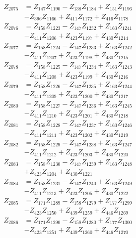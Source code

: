 \begin{multicols}{2}
\begin{align}
Z_{2075} &= Z_{147}Z_{1190} - Z_{138}Z_{1184} + Z_{151}Z_{1196}  \nonumber \\
&- Z_{396}Z_{1166} + Z_{411}Z_{1172} + Z_{416}Z_{1178} \nonumber \\
Z_{2076} &= Z_{158}Z_{1223} - Z_{147}Z_{1232} + Z_{163}Z_{1241}  \nonumber \\
&- Z_{411}Z_{1206} + Z_{423}Z_{1197} + Z_{430}Z_{1214} \nonumber \\
Z_{2077} &= Z_{158}Z_{1224} - Z_{147}Z_{1233} + Z_{163}Z_{1242}  \nonumber \\
&- Z_{411}Z_{1207} + Z_{423}Z_{1198} + Z_{430}Z_{1215} \nonumber \\
Z_{2078} &= Z_{158}Z_{1225} - Z_{147}Z_{1234} + Z_{163}Z_{1243}  \nonumber \\
&- Z_{411}Z_{1208} + Z_{423}Z_{1199} + Z_{430}Z_{1216} \nonumber \\
Z_{2079} &= Z_{158}Z_{1226} - Z_{147}Z_{1235} + Z_{163}Z_{1244}  \nonumber \\
&- Z_{411}Z_{1209} + Z_{423}Z_{1200} + Z_{430}Z_{1217} \nonumber \\
Z_{2080} &= Z_{158}Z_{1227} - Z_{147}Z_{1236} + Z_{163}Z_{1245}  \nonumber \\
&- Z_{411}Z_{1210} + Z_{423}Z_{1201} + Z_{430}Z_{1218} \nonumber \\
Z_{2081} &= Z_{158}Z_{1228} - Z_{147}Z_{1237} + Z_{163}Z_{1246}  \nonumber \\
&- Z_{411}Z_{1211} + Z_{423}Z_{1202} + Z_{430}Z_{1219} \nonumber \\
Z_{2082} &= Z_{158}Z_{1229} - Z_{147}Z_{1238} + Z_{163}Z_{1247}  \nonumber \\
&- Z_{411}Z_{1212} + Z_{423}Z_{1203} + Z_{430}Z_{1220} \nonumber \\
Z_{2083} &= Z_{158}Z_{1230} - Z_{147}Z_{1239} + Z_{163}Z_{1248}  \nonumber \\
&+ Z_{423}Z_{1204} + Z_{430}Z_{1221} \nonumber \\
Z_{2084} &= Z_{158}Z_{1231} - Z_{147}Z_{1240} + Z_{163}Z_{1249}  \nonumber \\
&- Z_{411}Z_{1213} + Z_{423}Z_{1205} + Z_{430}Z_{1222} \nonumber \\
Z_{2085} &= Z_{171}Z_{1289} - Z_{158}Z_{1279} + Z_{177}Z_{1299}  \nonumber \\
&- Z_{423}Z_{1250} + Z_{439}Z_{1259} + Z_{446}Z_{1269} \nonumber \\
Z_{2086} &= Z_{171}Z_{1290} - Z_{158}Z_{1280} + Z_{177}Z_{1300}  \nonumber \\
&- Z_{423}Z_{1251} + Z_{439}Z_{1260} + Z_{446}Z_{1270} \nonumber \\

\end{align}
\end{multicols}
